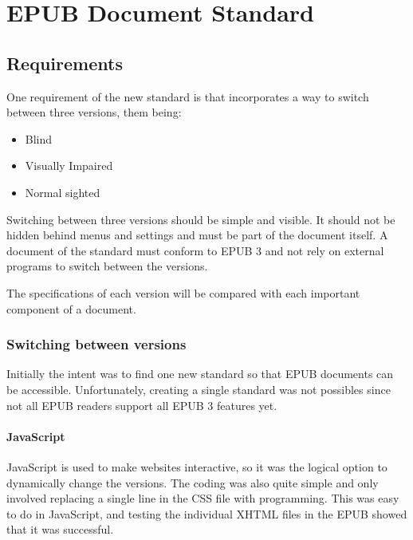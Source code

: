\chapter{EPUB Document Standard}
\label{ch:EPUB Document Standard}

\section{Requirements}

One requirement of the new standard is that incorporates a way to switch between three versions, them being:

\begin{itemize}
	\item Blind
	\item Visually Impaired
	\item Normal sighted
\end{itemize}

Switching between three versions should be simple and visible. It should not be hidden behind menus and settings and must be part of the document itself. A document of the standard must conform to EPUB 3 and not rely on external programs to switch between the versions.

The specifications of each version will be compared with each important component of a document.


\subsection{Switching between versions}

Initially the intent was to find one new standard so that EPUB documents can be accessible. Unfortunately, creating a single standard was not possibles since not all EPUB readers support all EPUB 3 features yet.

\subsubsection{JavaScript}
JavaScript is used to make websites interactive, so it was the logical option to dynamically change the versions. The coding was also quite simple and only involved replacing a single line in the CSS file with programming. This was easy to do in JavaScript, and testing the individual XHTML files in the EPUB showed that it was successful. 

